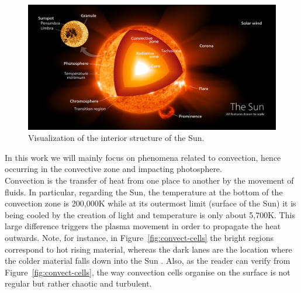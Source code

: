 \begin{figure}[t]
    \centering
    \includegraphics[width=\textwidth]{./pictures/interior.PNG}
    \caption{Visualization of the interior structure of the Sun. \cite{kelvin13}}
    \label{fig:structure}
\end{figure}
In this work we will mainly focus on phenomena related to convection, hence occurring in the convective zone and impacting photosphere.\\
Convection is the transfer of heat from one place to another by the movement of fluids. In particular, regarding the Sun, the temperature at the bottom of the convection zone is 200,000\degree K while at its outermost limit (surface of the Sun) it is being cooled by the creation of light and temperature is only about 5,700\degree K. This large difference triggers the plasma movement in order to propagate the heat outwards. Note, for instance, in Figure~\ref{fig:convect-cells} the bright regions correspond to hot rising material, whereas the dark lanes are the location where the colder material falls down into the Sun \cite{convect}. Also, as the reader can verify from Figure~\ref{fig:convect-cells}, the way convection cells organise on the surface is not regular but rather chaotic and turbulent.
